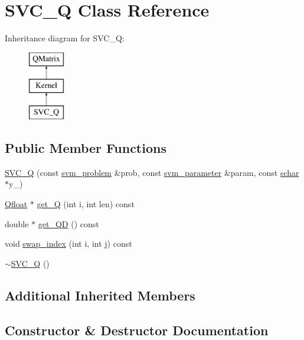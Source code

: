 \hypertarget{classSVC__Q}{}\section{S\+V\+C\+\_\+Q Class Reference}
\label{classSVC__Q}
Inheritance diagram for S\+V\+C\+\_\+Q\+:\begin{figure}[H]
\begin{center}
\leavevmode
\includegraphics[height=3.000000cm]{classSVC__Q}
\end{center}
\end{figure}
\subsection*{Public Member Functions}
\begin{DoxyCompactItemize}
\item 
\hyperlink{classSVC__Q_a23d7cf0b0606ccf2cb987205b94dddc7}{S\+V\+C\+\_\+Q} (const \hyperlink{structsvm__problem}{svm\+\_\+problem} \&prob, const \hyperlink{structsvm__parameter}{svm\+\_\+parameter} \&param, const \hyperlink{svm__core_8cpp_a0fd9ce9d735064461bebfe6037026093}{schar} $\ast$y\+\_\+)
\item 
\hyperlink{svm__core_8cpp_a8755d90a54ecfb8d15051af3e0542592}{Qfloat} $\ast$ \hyperlink{classSVC__Q_a9341b6030b3fdc88466e4a602b5abff0}{get\+\_\+Q} (int i, int len) const 
\item 
double $\ast$ \hyperlink{classSVC__Q_ac73020a6e438e209d63223e1fa8cac29}{get\+\_\+\+QD} () const 
\item 
void \hyperlink{classSVC__Q_a9c889db8ee0156ed5bcdaa4d6bc4e245}{swap\+\_\+index} (int i, int j) const 
\item 
\hyperlink{classSVC__Q_af491500a4a6e2df46083098ee3397142}{$\sim$\+S\+V\+C\+\_\+Q} ()
\end{DoxyCompactItemize}
\subsection*{Additional Inherited Members}


\subsection{Constructor \& Destructor Documentation}
